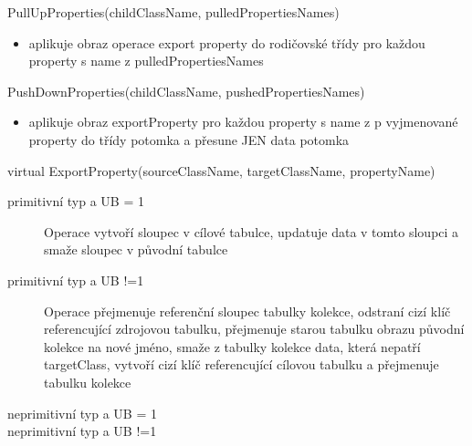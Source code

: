 \documentclass[11pt,twoside,a4paper]{book}
\begin{document}
\begin{list}{Operace :}{}

\item PullUpProperties(childClassName, pulledPropertiesNames)
 \begin{itemize}
   \item aplikuje obraz operace export property do rodičovské třídy pro každou
   property s name z pulledPropertiesNames
 \end{itemize}

\item PushDownProperties(childClassName, pushedPropertiesNames)
\begin{itemize}
  \item aplikuje obraz exportProperty pro každou property s name z p vyjmenované
  property do třídy potomka a přesune JEN data potomka
\end{itemize}

\item virtual ExportProperty(sourceClassName, targetClassName, propertyName) 
\begin{description}
	\item[primitivní typ a UB = 1] Operace vytvoří sloupec v cílové tabulce,
	updatuje data v tomto sloupci a smaže sloupec v původní tabulce
	\item[primitivní typ a UB !=1] Operace přejmenuje referenční sloupec tabulky
	kolekce, odstraní cizí klíč referencující zdrojovou tabulku, přejmenuje starou
	tabulku obrazu původní kolekce na nové jméno, smaže z tabulky kolekce data,
	která nepatří targetClass, vytvoří cizí klíč referencující cílovou tabulku a
	přejmenuje tabulku kolekce
	\item[neprimitivní typ a UB = 1]
	\item[neprimitivní typ a UB !=1]
\end{description}


\end{list}
\end{document}
